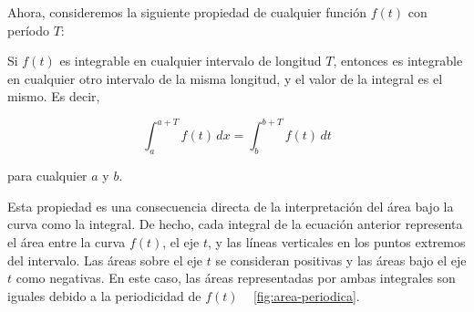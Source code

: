 Ahora, consideremos la siguiente propiedad de cualquier función \( f(t) \) con período \( T \):

Si \( f(t) \) es integrable en cualquier intervalo de longitud \( T \), entonces es integrable en cualquier otro intervalo de la misma longitud, y el valor de la integral es el mismo. Es decir,

\begin{equation} \label{eq21}
	\int_a^{a+T} f(t) \, dx = \int_b^{b+T} f(t) \, dt
\end{equation}

para cualquier \( a \) y \( b \).

Esta propiedad es una consecuencia directa de la interpretación del área bajo la curva como la integral. De hecho, cada integral de la ecuación anterior representa el área entre la curva \( f(t) \), el eje \( t \), y las líneas verticales en los puntos extremos del intervalo. Las áreas sobre el eje \( t \) se consideran positivas y las áreas bajo el eje \(t\) como negativas. En este caso, las áreas representadas por ambas integrales son iguales debido a la periodicidad de \( f(t) \) ~\cite{fourierTolstov} \ref{fig:area-periodica}.

